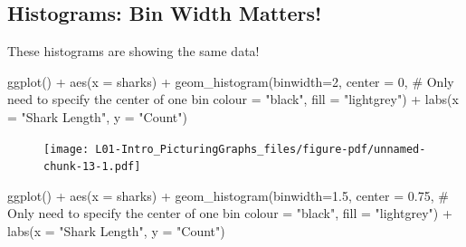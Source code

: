 \documentclass[
  letterpaper,
  DIV=11,
  numbers=noendperiod,
  oneside]{scrreprt}
\newenvironment{Shaded}{\begin{snugshade}}{\end{snugshade}}
\newcommand{\AttributeTok}[1]{\textcolor[rgb]{0.40,0.45,0.13}{#1}}
\newcommand{\CommentTok}[1]{\textcolor[rgb]{0.37,0.37,0.37}{#1}}
\newcommand{\DecValTok}[1]{\textcolor[rgb]{0.68,0.00,0.00}{#1}}
\newcommand{\FloatTok}[1]{\textcolor[rgb]{0.68,0.00,0.00}{#1}}
\newcommand{\FunctionTok}[1]{\textcolor[rgb]{0.28,0.35,0.67}{#1}}
\newcommand{\NormalTok}[1]{\textcolor[rgb]{0.00,0.23,0.31}{#1}}
\newcommand{\SpecialCharTok}[1]{\textcolor[rgb]{0.37,0.37,0.37}{#1}}
\newcommand{\StringTok}[1]{\textcolor[rgb]{0.13,0.47,0.30}{#1}}
\begin{document}
\hypertarget{histograms-bin-width-matters}{%
\subsection{Histograms: Bin Width
Matters!}\label{histograms-bin-width-matters}}

These histograms are showing the same data!

\begin{Shaded}
\begin{Highlighting}[]
\FunctionTok{ggplot}\NormalTok{() }\SpecialCharTok{+} 
    \FunctionTok{aes}\NormalTok{(}\AttributeTok{x =}\NormalTok{ sharks) }\SpecialCharTok{+}
    \FunctionTok{geom\_histogram}\NormalTok{(}\AttributeTok{binwidth=}\DecValTok{2}\NormalTok{, }
        \AttributeTok{center =} \DecValTok{0}\NormalTok{, }\CommentTok{\# Only need to specify the center of one bin}
        \AttributeTok{colour =} \StringTok{"black"}\NormalTok{, }\AttributeTok{fill =} \StringTok{"lightgrey"}\NormalTok{) }\SpecialCharTok{+}
    \FunctionTok{labs}\NormalTok{(}\AttributeTok{x =} \StringTok{"Shark Length"}\NormalTok{, }\AttributeTok{y =} \StringTok{"Count"}\NormalTok{)}
\end{Highlighting}
\end{Shaded}

\begin{figure}[H]

{\centering \texttt{[image: L01-Intro\_PicturingGraphs\_files/figure-pdf/unnamed-chunk-13-1.pdf]}

}

\end{figure}

\begin{Shaded}
\begin{Highlighting}[]
\FunctionTok{ggplot}\NormalTok{() }\SpecialCharTok{+} 
    \FunctionTok{aes}\NormalTok{(}\AttributeTok{x =}\NormalTok{ sharks) }\SpecialCharTok{+}
    \FunctionTok{geom\_histogram}\NormalTok{(}\AttributeTok{binwidth=}\FloatTok{1.5}\NormalTok{, }
        \AttributeTok{center =} \FloatTok{0.75}\NormalTok{, }\CommentTok{\# Only need to specify the center of one bin}
        \AttributeTok{colour =} \StringTok{"black"}\NormalTok{, }\AttributeTok{fill =} \StringTok{"lightgrey"}\NormalTok{) }\SpecialCharTok{+}
    \FunctionTok{labs}\NormalTok{(}\AttributeTok{x =} \StringTok{"Shark Length"}\NormalTok{, }\AttributeTok{y =} \StringTok{"Count"}\NormalTok{)}
\end{Highlighting}
\end{Shaded}
\end{document}
